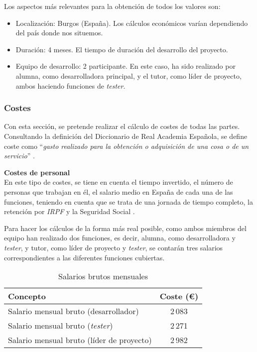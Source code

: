 Los aspectos más relevantes para la obtención de todos los valores son:
\begin{itemize}
    \item Localización: Burgos (España). Los cálculos económicos varían dependiendo del país donde nos situemos.
    \item Duración: 4 meses. El tiempo de duración del desarrollo del proyecto.
    \item Equipo de desarrollo: 2 participante. En este caso, ha sido realizado por alumna, como desarrolladora principal, y el tutor, como líder de proyecto, ambos haciendo funciones de \textit{tester}.
\end{itemize}

\subsubsection{Costes}
Con esta sección, se pretende realizar el cálculo de costes de todas las partes. Consultando la definición del Diccionario de Real Academia Española, se define coste como ``\textit{gasto realizado para la obtención o adquisición de una cosa o de un servicio}'' \cite{costeDef59:online}.

\textbf{Costes de personal} \\
En este tipo de costes, se tiene en cuenta el tiempo invertido, el número de personas que trabajan en él, el salario medio en España de cada una de las funciones, teniendo en cuenta que se trata de una jornada de tiempo completo, la retención por \textit{IRPF} \cite{Segurida22:online} y la Seguridad Social \cite{Segurida90:online}.

Para hacer los cálculos de la forma más real posible, como ambos miembros del equipo han realizado dos funciones, es decir, alumna, como desarrolladora y \textit{tester}, y tutor, como líder de proyecto y \textit{tester}, se contarán tres salarios correspondientes a las diferentes funciones cubiertas.

\begin{table}[H]
\centering
\begin{tabular}{lc}
\toprule
Concepto & Coste (€)  \\
\midrule
Salario mensual bruto (desarrollador) & 2\,083 \\
Salario mensual bruto (\textit{tester}) & 2\,271\\
Salario mensual bruto (líder de proyecto) & 2\,982\\
\bottomrule
\end{tabular}
\caption{Salarios brutos mensuales}
\end{table}


